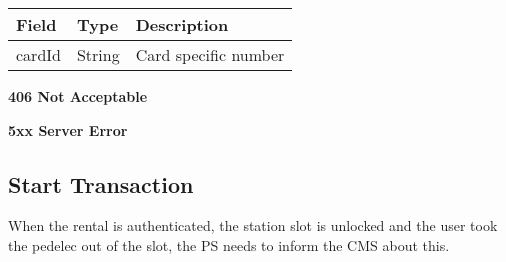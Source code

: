 \begin{table}[!h]
\begin{tabularx}{\linewidth}{ | l | l | X | }
  \hline
  \rowcolor{table-head}
  Field & Type & Description \\
  \hline
  	cardId 		& String & Card specific number\\
    \hline
\end{tabularx}
\end{table}

 \textbf{406 Not Acceptable}

\textbf{5xx Server Error}

%
%
%
%
%
%
%
%
%


\subsection{Start Transaction}

When the rental is authenticated, the station slot is unlocked and the user took the pedelec out of the slot, the \acs{PS} needs to inform the \acs{CMS} about this.


